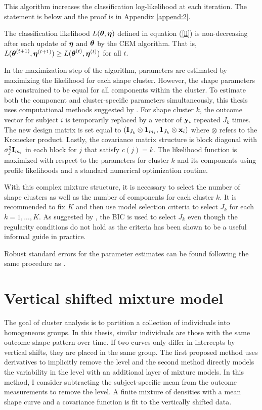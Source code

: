 This algorithm increases the classification log-likelihood at each iteration. The statement is below and the proof is in Appendix \ref{append:2}. 
\begin{theorem}\label{Thm:CEM} The classification likelihood $L(\boldsymbol\theta,\boldsymbol\eta)$ defined in equation (\ref{ll}) is non-decreasing after each update of $\boldsymbol\eta$ and $\boldsymbol\theta$ by the CEM algorithm. That is, $L(\boldsymbol\theta^{(t+1)},\boldsymbol\eta^{(t+1)}) \geq L(\boldsymbol\theta^{(t)},\boldsymbol\eta^{(t)})$ for all $t$.
\end{theorem}

In the maximization step of the algorithm, parameters are estimated by maximizing the likelihood for each shape cluster. However, the shape parameters are constrained to be equal for all components within the cluster. To estimate both the component and cluster-specific parameters simultaneously, this thesis uses computational methods suggested by \textcite{grun2008}. For shape cluster $k$, the outcome vector for subject $i$ is temporarily replaced by a vector of $\mathbf y_{i}$ repeated $J_{k}$ times. The new design matrix  is set equal to $(\mathbf I_{J_{k}}\otimes \boldsymbol 1_{m_{i}}, \boldsymbol 1_{J_{k}} \otimes \mathbf x_{i})$ where $\otimes$ refers to the Kronecker product. Lastly, the covariance matrix structure is block diagonal with $\sigma^{2}_{j}\mathbf I_{m_{i}}$ in each block for $j$ that satisfy $c(j)=k$. The likelihood function is maximized with respect to the parameters for cluster $k$ and its components using profile likelihoods and a standard numerical optimization routine.

With this complex mixture structure, it is necessary to select the number of shape clusters as well as the number of components for each cluster $k$. It is recommended to fix $K$ and then use model selection criteria to select $J_{k}$ for each $k=1,...,K$. As suggested by \textcite{li2005}, the BIC is used to select $J_{k}$ even though the regularity conditions do not hold as the criteria has been shown to be a useful informal guide in practice.

Robust standard errors for the parameter estimates can be found following the same procedure as \textcite{boldea2009}.

\section{Vertical shifted mixture model}
The goal of cluster analysis is to partition a collection of individuals into homogeneous groups. In this thesis, similar individuals are those with the same outcome shape pattern over time. If two curves only differ in intercepts by vertical shifts, they are placed in the same group. The first proposed method uses derivatives to implicitly remove the level and the second method directly models the variability in the level with an additional layer of mixture models.  In this method, I consider subtracting the subject-specific mean from the outcome measurements to remove the level. A finite mixture of densities with a mean shape curve and a covariance function is fit to the vertically shifted data. 

